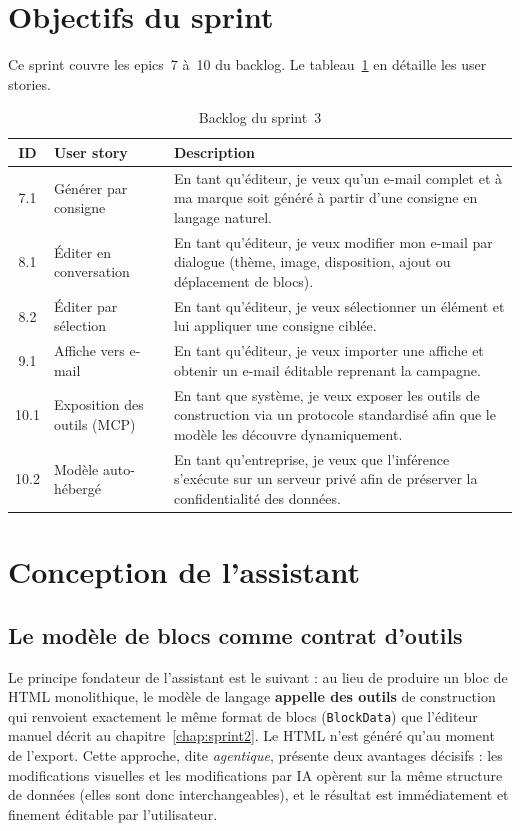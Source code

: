 \documentclass[12pt,a4paper,oneside]{report}
\begin{document}
\section{Objectifs du sprint}
Ce sprint couvre les epics~7 à~10 du backlog. Le
tableau~\ref{tab:backlog-s3} en détaille les user stories.

\begin{table}[H]
\centering
\caption{Backlog du sprint~3}
\label{tab:backlog-s3}
\small
\begin{tabularx}{\linewidth}{clX}
\toprule
\textbf{ID} & \textbf{User story} & \textbf{Description} \\
\midrule
7.1 & Générer par consigne & En tant qu'éditeur, je veux qu'un e-mail complet et à ma marque soit généré à partir d'une consigne en langage naturel. \\
8.1 & Éditer en conversation & En tant qu'éditeur, je veux modifier mon e-mail par dialogue (thème, image, disposition, ajout ou déplacement de blocs). \\
8.2 & Éditer par sélection & En tant qu'éditeur, je veux sélectionner un élément et lui appliquer une consigne ciblée. \\
9.1 & Affiche vers e-mail & En tant qu'éditeur, je veux importer une affiche et obtenir un e-mail éditable reprenant la campagne. \\
10.1 & Exposition des outils (MCP) & En tant que système, je veux exposer les outils de construction via un protocole standardisé afin que le modèle les découvre dynamiquement. \\
10.2 & Modèle auto-hébergé & En tant qu'entreprise, je veux que l'inférence s'exécute sur un serveur privé afin de préserver la confidentialité des données. \\
\bottomrule
\end{tabularx}
\end{table}

\section{Conception de l'assistant}

\subsection{Le modèle de blocs comme contrat d'outils}
Le principe fondateur de l'assistant est le suivant : au lieu de produire un
bloc de HTML monolithique, le modèle de langage \textbf{appelle des outils}
de construction qui renvoient exactement le même format de blocs
(\texttt{BlockData}) que l'éditeur manuel décrit au
chapitre~\ref{chap:sprint2}. Le HTML n'est généré qu'au moment de l'export.
Cette approche, dite \emph{agentique}, présente deux avantages décisifs :
les modifications visuelles et les modifications par IA opèrent sur la même
structure de données (elles sont donc interchangeables), et le résultat est
immédiatement et finement éditable par l'utilisateur.
\end{document}
